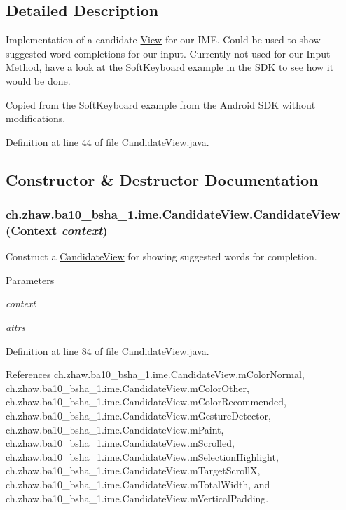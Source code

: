 \subsection{Detailed Description}
Implementation of a candidate \hyperlink{}{View} for our IME. Could be used to show suggested word-\/completions for our input. Currently not used for our Input Method, have a look at the SoftKeyboard example in the SDK to see how it would be done.

Copied from the SoftKeyboard example from the Android SDK without modifications. 

Definition at line 44 of file CandidateView.java.

\subsection{Constructor \& Destructor Documentation}
\hypertarget{classch_1_1zhaw_1_1ba10__bsha__1_1_1ime_1_1CandidateView_a75f1d36bd5cff9a3ea522c83fc9b2f8e}{
\subsubsection[{CandidateView}]{\setlength{\rightskip}{0pt plus 5cm}ch.zhaw.ba10\_\-bsha\_\-1.ime.CandidateView.CandidateView (Context {\em context})}}
\label{classch_1_1zhaw_1_1ba10__bsha__1_1_1ime_1_1CandidateView_a75f1d36bd5cff9a3ea522c83fc9b2f8e}
Construct a \hyperlink{classch_1_1zhaw_1_1ba10__bsha__1_1_1ime_1_1CandidateView}{CandidateView} for showing suggested words for completion. 
\begin{DoxyParams}{Parameters}
\item[{\em context}]\item[{\em attrs}]\end{DoxyParams}


Definition at line 84 of file CandidateView.java.

References ch.zhaw.ba10\_\-bsha\_\-1.ime.CandidateView.mColorNormal, ch.zhaw.ba10\_\-bsha\_\-1.ime.CandidateView.mColorOther, ch.zhaw.ba10\_\-bsha\_\-1.ime.CandidateView.mColorRecommended, ch.zhaw.ba10\_\-bsha\_\-1.ime.CandidateView.mGestureDetector, ch.zhaw.ba10\_\-bsha\_\-1.ime.CandidateView.mPaint, ch.zhaw.ba10\_\-bsha\_\-1.ime.CandidateView.mScrolled, ch.zhaw.ba10\_\-bsha\_\-1.ime.CandidateView.mSelectionHighlight, ch.zhaw.ba10\_\-bsha\_\-1.ime.CandidateView.mTargetScrollX, ch.zhaw.ba10\_\-bsha\_\-1.ime.CandidateView.mTotalWidth, and ch.zhaw.ba10\_\-bsha\_\-1.ime.CandidateView.mVerticalPadding.


